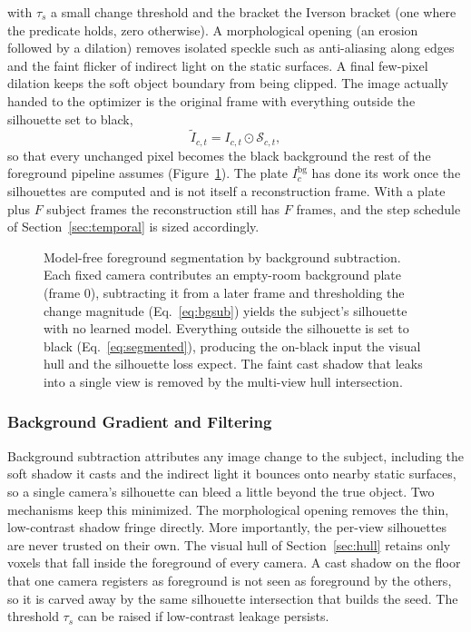 with $\tau_s$ a small change threshold and the bracket the Iverson bracket (one where the
predicate holds, zero otherwise). A morphological opening (an erosion followed by a
dilation) removes isolated speckle such as anti-aliasing along edges and the faint flicker
of indirect light on the static surfaces. A final few-pixel dilation keeps the soft
object boundary from being clipped. The image actually handed to the optimizer is the
original frame with everything outside the silhouette set to black,
\begin{equation}
    \tilde I_{c,t} = I_{c,t} \odot \mathcal{S}_{c,t},
    \label{eq:segmented}
\end{equation}
so that every unchanged pixel becomes the black background the rest of the foreground
pipeline assumes (Figure~\ref{fig:bgsub}). The plate $I^{\mathrm{bg}}_c$ has done its work
once the silhouettes are computed and is not itself a reconstruction frame. With a
plate plus $F$ subject frames the reconstruction still has $F$ frames, and the step schedule
of Section~\ref{sec:temporal} is sized accordingly.

\begin{figure}[!ht]
    \centering
    \resizebox{0.96\linewidth}{!}{}
    \caption{Model-free foreground segmentation by background subtraction. Each
    fixed camera
    contributes an empty-room background plate (frame $0$), subtracting it from a later
    frame and thresholding the change magnitude (Eq.~\eqref{eq:bgsub}) yields the subject's
    silhouette with no learned model. Everything outside the silhouette is set to black
    (Eq.~\eqref{eq:segmented}), producing the on-black input the visual hull and the
    silhouette loss expect. The faint cast shadow that leaks into a single view is removed by
    the multi-view hull intersection.}
    \label{fig:bgsub}
\end{figure}

\subsubsection{Background Gradient and Filtering}

Background subtraction attributes
any image change to the subject, including the soft shadow it casts and the indirect
light it bounces onto nearby static surfaces, so a single camera's silhouette can bleed a
little beyond the true object. Two mechanisms keep this minimized. The morphological opening
removes the thin, low-contrast shadow fringe directly. More importantly, the per-view
silhouettes are never trusted on their own. The visual hull of Section~\ref{sec:hull} retains
only voxels that fall inside the foreground of every camera. A cast shadow on the
floor that one camera registers as foreground is not seen as foreground by the others, so it
is carved away by the same silhouette intersection that builds the seed. The threshold
$\tau_s$ can be raised if low-contrast leakage persists.


